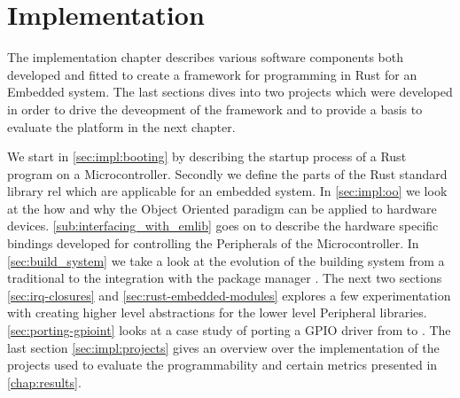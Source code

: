 \chapter{Implementation}
\label{chap:impl}

The implementation chapter describes various software components both developed and fitted to create a framework for programming in Rust for an Embedded system.
The last sections dives into two projects which were developed in order to drive the deveopment of the framework and to provide a basis to evaluate the platform in the next chapter.

We start in \autoref{sec:impl:booting} by describing the startup process of a Rust program on a Microcontroller.
Secondly we define the parts of the Rust standard library \gls{rel} which are applicable for an embedded system.
In \autoref{sec:impl:oo} we look at the how and why the Object Oriented paradigm can be applied to hardware devices.
\autoref{sub:interfacing_with_emlib} goes on to describe the hardware specific bindings developed for controlling the Peripherals of the Microcontroller.
In \autoref{sec:build_system} we take a look at the evolution of the building system from a traditional  to the integration with the {\rust} package manager {\cargo}.
The next two sections \autoref{sec:irq-closures} and \autoref{sec:rust-embedded-modules} explores a few experimentation with creating higher level abstractions for the lower level Peripheral libraries.
\autoref{sec:porting-gpioint} looks at a case study of porting a GPIO driver from {\C} to {\rust}.
The last section \autoref{sec:impl:projects} gives an overview over the implementation of the projects used to evaluate the programmability and certain metrics presented in \autoref{chap:results}.










